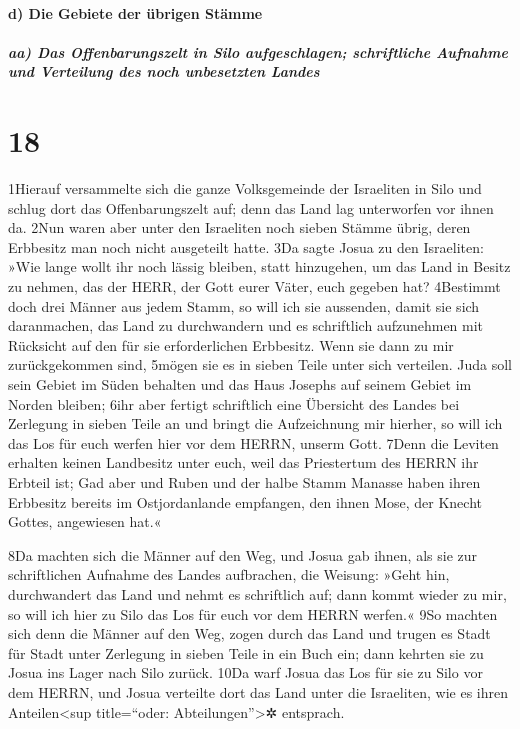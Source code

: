\hypertarget{d-die-gebiete-der-uxfcbrigen-stuxe4mme}{%
\paragraph{d) Die Gebiete der übrigen
Stämme}\label{d-die-gebiete-der-uxfcbrigen-stuxe4mme}}

\hypertarget{aa-das-offenbarungszelt-in-silo-aufgeschlagen-schriftliche-aufnahme-und-verteilung-des-noch-unbesetzten-landes}{%
\subparagraph{aa) Das Offenbarungszelt in Silo aufgeschlagen;
schriftliche Aufnahme und Verteilung des noch unbesetzten
Landes}\label{aa-das-offenbarungszelt-in-silo-aufgeschlagen-schriftliche-aufnahme-und-verteilung-des-noch-unbesetzten-landes}}

\hypertarget{section-17}{%
\section{18}\label{section-17}}

1Hierauf versammelte sich die ganze Volksgemeinde der Israeliten in Silo
und schlug dort das Offenbarungszelt auf; denn das Land lag unterworfen
vor ihnen da. 2Nun waren aber unter den Israeliten noch sieben Stämme
übrig, deren Erbbesitz man noch nicht ausgeteilt hatte. 3Da sagte Josua
zu den Israeliten: »Wie lange wollt ihr noch lässig bleiben, statt
hinzugehen, um das Land in Besitz zu nehmen, das der HERR, der Gott
eurer Väter, euch gegeben hat? 4Bestimmt doch drei Männer aus jedem
Stamm, so will ich sie aussenden, damit sie sich daranmachen, das Land
zu durchwandern und es schriftlich aufzunehmen mit Rücksicht auf den für
sie erforderlichen Erbbesitz. Wenn sie dann zu mir zurückgekommen sind,
5mögen sie es in sieben Teile unter sich verteilen. Juda soll sein
Gebiet im Süden behalten und das Haus Josephs auf seinem Gebiet im
Norden bleiben; 6ihr aber fertigt schriftlich eine Übersicht des Landes
bei Zerlegung in sieben Teile an und bringt die Aufzeichnung mir
hierher, so will ich das Los für euch werfen hier vor dem HERRN, unserm
Gott. 7Denn die Leviten erhalten keinen Landbesitz unter euch, weil das
Priestertum des HERRN ihr Erbteil ist; Gad aber und Ruben und der halbe
Stamm Manasse haben ihren Erbbesitz bereits im Ostjordanlande empfangen,
den ihnen Mose, der Knecht Gottes, angewiesen hat.«

8Da machten sich die Männer auf den Weg, und Josua gab ihnen, als sie
zur schriftlichen Aufnahme des Landes aufbrachen, die Weisung: »Geht
hin, durchwandert das Land und nehmt es schriftlich auf; dann kommt
wieder zu mir, so will ich hier zu Silo das Los für euch vor dem HERRN
werfen.« 9So machten sich denn die Männer auf den Weg, zogen durch das
Land und trugen es Stadt für Stadt unter Zerlegung in sieben Teile in
ein Buch ein; dann kehrten sie zu Josua ins Lager nach Silo zurück. 10Da
warf Josua das Los für sie zu Silo vor dem HERRN, und Josua verteilte
dort das Land unter die Israeliten, wie es ihren Anteilen\textless sup
title=``oder: Abteilungen''\textgreater✲ entsprach.

